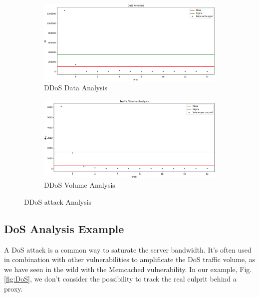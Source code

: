 \begin{figure}[h]
	\begin{subfigure}{0.48\textwidth}
		\includegraphics[width=\textwidth]{imgs/DDoSMixed-data_analysis}
		\caption{DDoS Data Analysis} 
		\label{fig:ddos_data}
	\end{subfigure}
	\hspace*{\fill} %
	\begin{subfigure}{0.48\textwidth}
		\includegraphics[width=\textwidth]{imgs/DDoSMixed-volume_analysis}
		\caption{DDoS Volume Analysis} 
		\label{fig:ddos_volume}
	\end{subfigure}
	\caption{DDoS attack Analysis}
	\label{fig:ddos_analysis}
\end{figure}  
  
\subsection{DoS Analysis Example}
A DoS attack is a common way to saturate the server bandwidth. It's often used in combination with other vulnerabilities to amplificate the DoS traffic volume, as we have seen in the wild with the Memcached vulnerability\cite{memcached_vulnerability}. 
In our example, Fig. \ref{fig:DoS}, we don't consider the possibility to track the real culprit behind a proxy.

